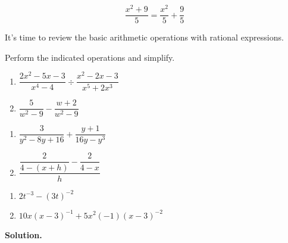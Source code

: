 \[ \dfrac{x^2+9}{5} = \dfrac{x^2}{5} + \dfrac{9}{5} \] 

It's time to review the basic arithmetic operations with rational expressions. 

\pagebreak

\begin{ex} \label{rationalexpressionreviewex} Perform the indicated operations and simplify.

\begin{multicols}{2}
\begin{enumerate}

\item  $\dfrac{2x^2-5x-3}{x^4 - 4} \div \dfrac{x^2-2x-3}{x^5 + 2x^3}$

\item  $\dfrac{5}{w^2 - 9} - \dfrac{w+2}{w^2-9}$

\setcounter{HW}{\value{enumi}}
\end{enumerate}

\end{multicols}

\begin{multicols}{2}
\begin{enumerate}
\setcounter{enumi}{\value{HW}}

\item  $\dfrac{3}{y^2 - 8y + 16} + \dfrac{y+1}{16y - y^3}$

\item  $\dfrac{\dfrac{2}{4 - (x+h)} - \dfrac{2}{4-x}}{h}$

\setcounter{HW}{\value{enumi}}
\end{enumerate}

\end{multicols}

\begin{multicols}{2}
\begin{enumerate}
\setcounter{enumi}{\value{HW}}

\item  $2t^{-3} - (3t)^{-2}$

\item  $10x(x-3)^{-1} + 5x^2(-1)(x-3)^{-2}$

\setcounter{HW}{\value{enumi}}
\end{enumerate}

\end{multicols}

{\bf Solution.}


\end{ex}
